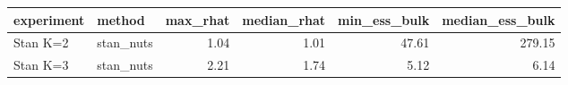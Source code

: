 \begin{tabular}{llrrrr}
\toprule
experiment & method & max\_rhat & median\_rhat & min\_ess\_bulk & median\_ess\_bulk \\
\midrule
Stan K=2 & stan\_nuts & 1.04 & 1.01 & 47.61 & 279.15 \\
Stan K=3 & stan\_nuts & 2.21 & 1.74 & 5.12 & 6.14 \\
\bottomrule
\end{tabular}

